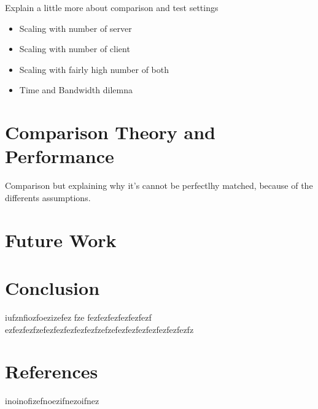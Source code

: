 \documentclass{article}
\begin{document}
Explain a little more about comparison and test settings


\begin{itemize}


\item Scaling with number of server
\item Scaling with number of client
\item Scaling with fairly high number of both 
\item Time and Bandwidth dilemna

\end{itemize}


\section{Comparison Theory and Performance}
Comparison but explaining why it's cannot be perfectlhy matched, because of the differents assumptions.

\section{Future Work}

\newpage
\section*{Conclusion}
iufznfiozfoezizefez fze
fezfezfezfezfezfezf
ezfezfezfzefezfezfezfezfezfzefzefezfezfezfezfezfezfezfz

\newpage
\section*{References}

inoinofizefnoezifnezoifnez
\end{document}
